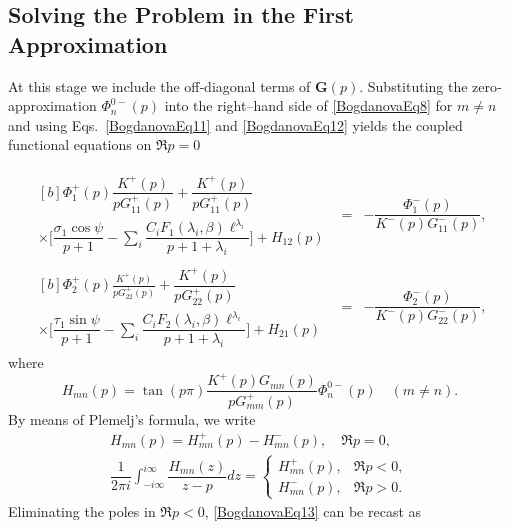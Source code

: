 \subsection{Solving the Problem in the First Approximation}

At this stage we include the off‐diagonal terms of \(\mathbf G(p)\).  Substituting the zero‐approximation \(\Phi_n^{0-}(p)\) into the right–hand side of \eqref{BogdanovaEq8} for \(m\neq n\) and using  Eqs.~\eqref{BogdanovaEq11} and \eqref{BogdanovaEq12} yields  the coupled functional equations on \(\Re p=0\)

\begin{equation}\label{BogdanovaEq13}
	\begin{array}{rcl}
		\begin{multlined}[b]
		\Phi_{1}^{+}(p)\dfrac{K^{+}(p)}{pG_{11}^{+}(p)}
		+\dfrac{K^{+}(p)}{pG_{11}^{+}(p)}
		\\[-.5em]
		\times	\biggl[\dfrac{\sigma_{1}\cos\psi}{p+1}
		-\displaystyle\sum_{i}\dfrac{C_{i}F_{1}(\lambda_{i},\beta)\ell^{\lambda_{i}}}
		{p+1+\lambda_{i}}\biggr] +H_{12}(p)
	   \end{multlined}
       &=&-\dfrac{\Phi_{1}^{-}(p)}{K^{-}(p) G_{11}^{-}(p)},
		\\
		\begin{multlined}[b]
			\Phi_{2}^{+}(p)\frac{K^{+}(p)}{pG_{22}^{+}(p)}
		+\dfrac{K^{+}(p)}{pG_{22}^{+}(p)} 
		\\[-.5em]
		\times\biggl[\dfrac{\tau_{1}\sin\psi}{p+1}
		-\displaystyle\sum_{i}\dfrac{C_{i}F_{2}(\lambda_{i},\beta)\ell^{\lambda_{i}}}
		{p+1+\lambda_{i}}\biggr]+H_{21}(p)
		\end{multlined}
	    &=&-\dfrac{\Phi_{2}^{-}(p)}{K^{-}(p)G_{22}^{-}(p)}, 
	   \end{array}
\end{equation}
where
\[
H_{mn}(p)
=\tan(p\pi)\dfrac{K^{+}(p) G_{mn}(p)}{pG_{mm}^{+}(p)}\Phi_{n}^{0-}(p)
\quad (m\neq n).
\]
By means of Plemelj’s formula, we write
\begin{equation*}
	\begin{array}{l}
	H_{mn}(p)=H_{mn}^{+}(p)-H_{mn}^{-}(p),\quad \Re p=0,
	\\
\dfrac{1}{2\pi i}\displaystyle\int_{-i\infty}^{i\infty}\dfrac{H_{mn}(z)}{z-p}dz
	=\begin{cases}
		H_{mn}^{+}(p), & \Re p<0,\\
		H_{mn}^{-}(p), & \Re p>0.
	\end{cases}
	\end{array}
\end{equation*}
 Eliminating the poles in \(\Re p<0\), \eqref{BogdanovaEq13} can be recast as



